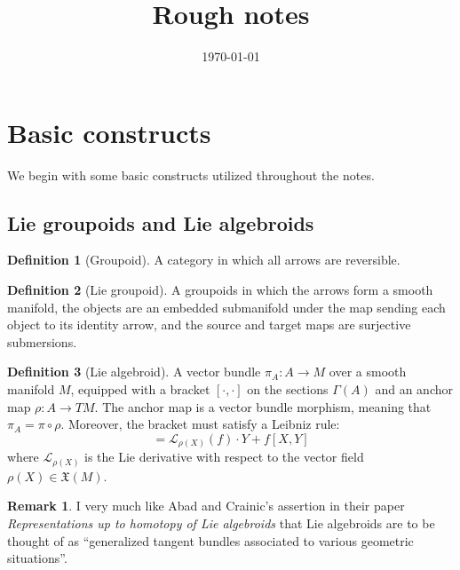 \documentclass[aps,pra,showpacs,notitlepage,onecolumn,superscriptaddress,nofootinbib]{revtex4-1}
\theoremstyle{definition}
\newtheorem{definition}{Definition}[section]
\newtheorem{remark}{Remark}[section]
\begin{document}
\title{Rough notes}
\date{\today}
\maketitle

\tableofcontents

\section{Basic constructs}

\noindent We begin with some basic constructs utilized throughout the notes.

\subsection{Lie groupoids and Lie algebroids}

\begin{definition}[Groupoid]
    A category in which all arrows are reversible.
\end{definition}

\begin{definition}[Lie groupoid]
    A groupoids in which the arrows form a smooth manifold, the objects are an embedded submanifold under the map sending each object to its identity arrow, and the source and target maps
    are surjective submersions.
\end{definition}

\begin{definition}[Lie algebroid]
A vector bundle $\pi_A : A \rightarrow M$ over a smooth manifold $M$, equipped with a bracket $[\cdot, \cdot]$ on the sections $\Gamma(A)$ and an anchor map $\rho : A \rightarrow TM$. The 
anchor map is a vector bundle morphism, meaning that $\pi_A = \pi \circ \rho$. Moreover, the bracket must satisfy a Leibniz rule:
\begin{equation}
    [X, f Y] = \mathcal{L}_{\rho(X)}(f) \cdot Y + f [X, Y]
\end{equation}
where $\mathcal{L}_{\rho(X)}$ is the Lie derivative with respect to the vector field $\rho(X) \in \mathfrak{X}(M)$.
\end{definition}

\begin{remark}
    I very much like Abad and Crainic's assertion in their paper \emph{Representations up to homotopy of Lie algebroids} that Lie algebroids are to be thought of as ``generalized tangent bundles associated 
    to various geometric situations''.
\end{remark}
\end{document}
